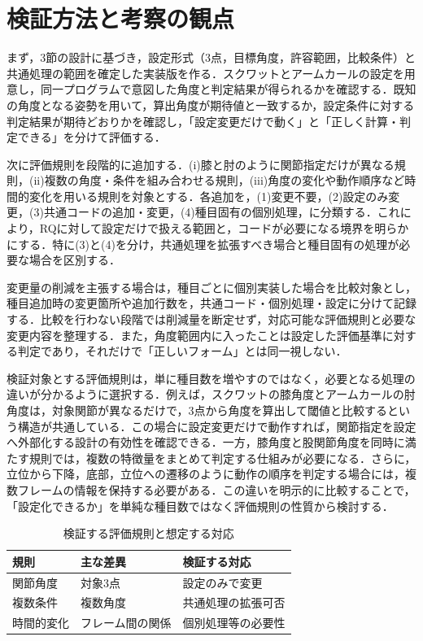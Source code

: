 \documentclass[no-page-number]{nanzan-abstract}
\begin{document}
\section{検証方法と考察の観点}
まず，3節の設計に基づき，設定形式（3点，目標角度，許容範囲，比較条件）と共通処理の範囲を確定した実装版を作る．スクワットとアームカールの設定を用意し，同一プログラムで意図した角度と判定結果が得られるかを確認する．既知の角度となる姿勢を用いて，算出角度が期待値と一致するか，設定条件に対する判定結果が期待どおりかを確認し，「設定変更だけで動く」と「正しく計算・判定できる」を分けて評価する．
\par
次に評価規則を段階的に追加する．(i)膝と肘のように関節指定だけが異なる規則，(ii)複数の角度・条件を組み合わせる規則，(iii)角度の変化や動作順序など時間的変化を用いる規則を対象とする．各追加を，(1)変更不要，(2)設定のみ変更，(3)共通コードの追加・変更，(4)種目固有の個別処理，に分類する．これにより，RQに対して設定だけで扱える範囲と，コードが必要になる境界を明らかにする．特に(3)と(4)を分け，共通処理を拡張すべき場合と種目固有の処理が必要な場合を区別する．
\par
変更量の削減を主張する場合は，種目ごとに個別実装した場合を比較対象とし，種目追加時の変更箇所や追加行数を，共通コード・個別処理・設定に分けて記録する．比較を行わない段階では削減量を断定せず，対応可能な評価規則と必要な変更内容を整理する．また，角度範囲内に入ったことは設定した評価基準に対する判定であり，それだけで「正しいフォーム」とは同一視しない．

検証対象とする評価規則は，単に種目数を増やすのではなく，必要となる処理の違いが分かるように選択する．例えば，スクワットの膝角度とアームカールの肘角度は，対象関節が異なるだけで，3点から角度を算出して閾値と比較するという構造が共通している．この場合に設定変更だけで動作すれば，関節指定を設定へ外部化する設計の有効性を確認できる．一方，膝角度と股関節角度を同時に満たす規則では，複数の特徴量をまとめて判定する仕組みが必要になる．さらに，立位から下降，底部，立位への遷移のように動作の順序を判定する場合には，複数フレームの情報を保持する必要がある．この違いを明示的に比較することで，「設定化できるか」を単純な種目数ではなく評価規則の性質から検討する．

\begin{table}[t]
\centering
\caption{検証する評価規則と想定する対応}
\small
\begin{tabular}{p{}p{}p{}}
\toprule
規則 & 主な差異 & 検証する対応\\
\midrule
関節角度 & 対象3点 & 設定のみで変更\\
複数条件 & 複数角度 & 共通処理の拡張可否\\
時間的変化 & フレーム間の関係 & 個別処理等の必要性\\
\bottomrule
\end{tabular}
\end{table}
\end{document}
